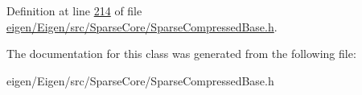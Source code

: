 Definition at line \hyperlink{eigen_2_eigen_2src_2_sparse_core_2_sparse_compressed_base_8h_source_l00214}{214} of file \hyperlink{eigen_2_eigen_2src_2_sparse_core_2_sparse_compressed_base_8h_source}{eigen/\+Eigen/src/\+Sparse\+Core/\+Sparse\+Compressed\+Base.\+h}.



The documentation for this class was generated from the following file\+:\begin{DoxyCompactItemize}
\item 
eigen/\+Eigen/src/\+Sparse\+Core/\+Sparse\+Compressed\+Base.\+h\end{DoxyCompactItemize}
